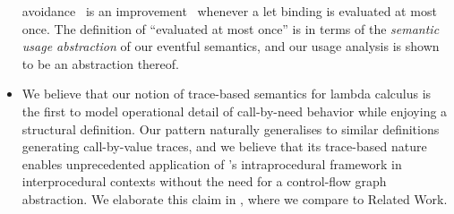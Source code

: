 \begin{itemize}
  avoidance~\citep{Gustavsson:98} is an
  improvement~\citep{MoranSands:99} whenever a let binding is evaluated at
  most once.
  The definition of ``evaluated at most once'' is in terms of the
  \emph{semantic usage abstraction} of our eventful semantics, and
  our usage analysis is shown to be an abstraction thereof.
\item
  We believe that our notion of trace-based semantics for lambda calculus
  is the first to model operational detail of call-by-need behavior while
  enjoying a structural definition. Our pattern naturally generalises
  to similar definitions generating call-by-value traces, and we believe
  that its trace-based nature enables unprecedented application of
  \citeauthor{Cousot:21}'s intraprocedural framework in interprocedural
  contexts without the need for a control-flow graph abstraction.
  We elaborate this claim in , where we compare to
  Related Work.
\end{itemize}


